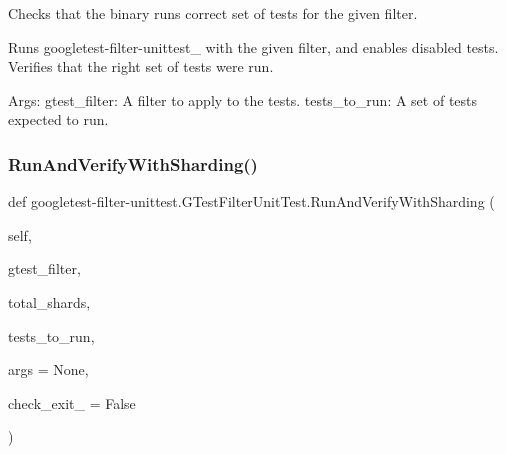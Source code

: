 \begin{DoxyVerb}Checks that the binary runs correct set of tests for the given filter.

Runs googletest-filter-unittest_ with the given filter, and enables
disabled tests. Verifies that the right set of tests were run.

Args:
  gtest_filter: A filter to apply to the tests.
  tests_to_run: A set of tests expected to run.
\end{DoxyVerb}
 \mbox{\label{classgoogletest-filter-unittest_1_1GTestFilterUnitTest_a9facb1098281a67776081c772fdd78d5}} 
\subsubsection{\texorpdfstring{Run\+And\+Verify\+With\+Sharding()}{RunAndVerifyWithSharding()}}
{\footnotesize\ttfamily def googletest-\/filter-\/unittest.\+G\+Test\+Filter\+Unit\+Test.\+Run\+And\+Verify\+With\+Sharding (\begin{DoxyParamCaption}\item[{}]{self,  }\item[{}]{gtest\+\_\+filter,  }\item[{}]{total\+\_\+shards,  }\item[{}]{tests\+\_\+to\+\_\+run,  }\item[{}]{args = {\ttfamily None},  }\item[{}]{check\+\_\+exit\+\_ = {\ttfamily False} }\end{DoxyParamCaption})}

